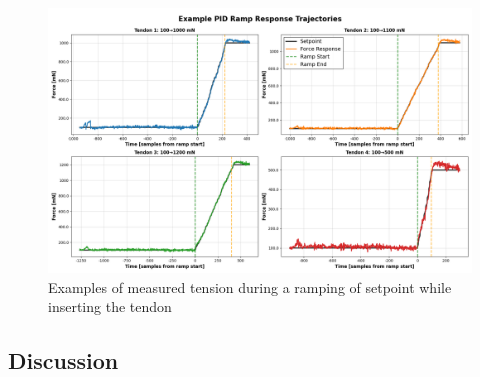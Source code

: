 \begin{figure} [H]
    \centering
    \includegraphics[width=\linewidth]{images/PID performance/rampExamples.png}
    \caption{Examples of measured tension during a ramping of setpoint while inserting the tendon}
    \label{fig:rampresponse}
\end{figure}

\subsection{Discussion}
